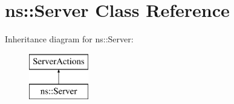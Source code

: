 \hypertarget{classns_1_1_server}{}\section{ns\+:\+:Server Class Reference}
\label{classns_1_1_server}
Inheritance diagram for ns\+:\+:Server\+:\begin{figure}[H]
\begin{center}
\leavevmode
\includegraphics[height=2.000000cm]{classns_1_1_server}
\end{center}
\end{figure}
